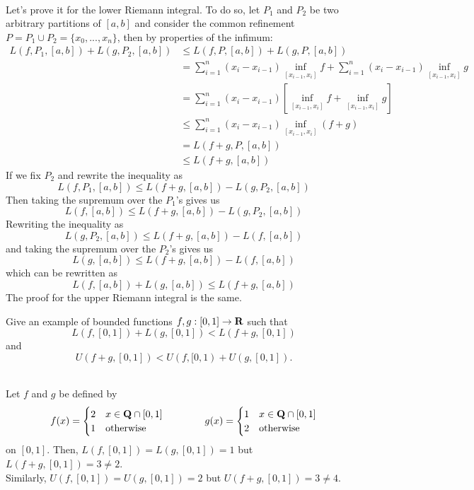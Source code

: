 \begin{solution}
    \\ Let's prove it for the lower Riemann integral. To do so, let $P_1$ and $P_2$ be two arbitrary partitions of $[a,b]$ and consider the common refinement $P = P_1 \cup P_2 = \{x_0, ..., x_n\}$, then by properties of the infimum:
    \begin{align*}
        L(f, P_1, [a,b]) + L(g, P_2, [a,b]) &\leq L(f, P, [a,b]) + L(g, P, [a,b]) \\
        &= \sum_{i=1}^{n}(x_i - x_{i-1})\inf_{[x_{i-1}, x_i]}f + \sum_{i=1}^{n}(x_i - x_{i-1})\inf_{[x_{i-1}, x_i]}g \\
        &= \sum_{i=1}^{n}(x_i - x_{i-1})\left[\inf_{[x_{i-1}, x_i]}f + \inf_{[x_{i-1}, x_i]}g\right] \\
        &\leq \sum_{i=1}^{n}(x_i - x_{i-1})\inf_{[x_{i-1}, x_i]}(f+g) \\
        &= L(f+g, P, [a,b]) \\
        &\leq L(f+g, [a,b])
    \end{align*}
    If we fix $P_2$ and rewrite the inequality as
    $$L(f, P_1, [a,b]) \leq L(f+g, [a,b]) - L(g, P_2, [a,b])$$
    Then taking the supremum over the $P_1$'s gives us
    $$L(f, [a,b]) \leq L(f+g, [a,b]) - L(g, P_2, [a,b])$$
    Rewriting the inequality as 
    $$L(g, P_2, [a,b]) \leq L(f+g, [a,b]) - L(f, [a,b])$$
    and taking the supremum over the $P_2$'s gives us
    $$L(g, [a,b]) \leq L(f+g, [a,b]) - L(f, [a,b])$$
    which can be rewritten as
    $$L(f, [a,b]) + L(g, [a,b]) \leq L(f+g, [a,b])$$
    The proof for the upper Riemann integral is the same. \\
\end{solution}

\begin{exercise}
    Give an example of bounded functions $f, g : [0,1] \to \mathbf{R}$ such that
    $$L(f, [0,1]) + L(g, [0,1]) < L(f+g, [0,1])$$
    and 
    $$U(f+g, [0,1]) < U(f, [0,1) + U(g, [0,1]).$$
\end{exercise}

\begin{solution}
    \\Let $f$ and $g$ be defined by
    $$f(x)=\begin{cases} 2 & x\in \mathbf{Q} \cap [0,1] \\ 1 & \text{otherwise}\end{cases} \qquad \qquad g(x)=\begin{cases} 1 & x\in \mathbf{Q} \cap [0,1] \\ 2 & \text{otherwise}\end{cases} $$
    on $[0,1]$. Then, $L(f, [0,1]) = L(g, [0,1]) = 1$ but $L(f+g, [0,1]) = 3 \neq 2$. \\
    Similarly, $U(f, [0,1]) = U(g, [0,1]) = 2$ but $U(f+g, [0,1]) = 3 \neq 4$.\\
\end{solution}


